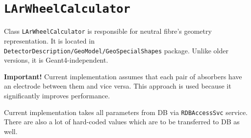 \documentclass{article}
\begin{document}
\section{\tt LArWheelCalculator}
Class {\tt LArWheelCalculator} is responsible for neutral fibre's geometry
representation. It is located in {\tt
DetectorDescription/GeoModel/GeoSpecialShapes} package. Unlike older versions,
it is Geant4-independent.

{\bf Important!} Current implementation assumes that each pair of absorbers have
an electrode between them and vice versa. This approach is used
because it significantly improves performance.

Current implementation takes all parameters from DB via {\tt RDBAccessSvc}
service. There are also a lot of hard-coded values which are to be transferred
to DB as well.
\end{document}
